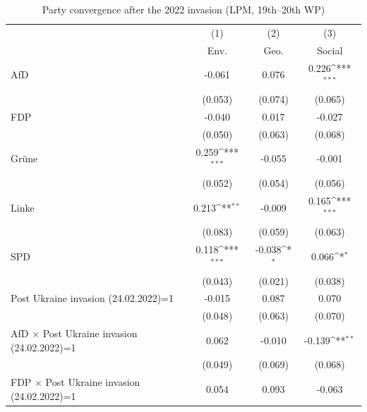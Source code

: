 \begin{table}[htbp]\centering
\def\sym#1{\ifmmode^{#1}\else\(^{#1}\)\fi}
\caption{Party convergence after the 2022 invasion (LPM, 19th--20th WP)}
\begin{tabular}{l*{3}{c}}
\toprule
                    &\multicolumn{1}{c}{(1)}&\multicolumn{1}{c}{(2)}&\multicolumn{1}{c}{(3)}\\
                    &\multicolumn{1}{c}{Env.}&\multicolumn{1}{c}{Geo.}&\multicolumn{1}{c}{Social}\\
\midrule
AfD                 &      -0.061         &       0.076         &       0.226\sym{***}\\
                    &     (0.053)         &     (0.074)         &     (0.065)         \\
\addlinespace
FDP                 &      -0.040         &       0.017         &      -0.027         \\
                    &     (0.050)         &     (0.063)         &     (0.068)         \\
\addlinespace
Grüne               &       0.259\sym{***}&      -0.055         &      -0.001         \\
                    &     (0.052)         &     (0.054)         &     (0.056)         \\
\addlinespace
Linke               &       0.213\sym{**} &      -0.009         &       0.165\sym{***}\\
                    &     (0.083)         &     (0.059)         &     (0.063)         \\
\addlinespace
SPD                 &       0.118\sym{***}&      -0.038\sym{*}  &       0.066\sym{*}  \\
                    &     (0.043)         &     (0.021)         &     (0.038)         \\
\addlinespace
Post Ukraine invasion (24.02.2022)=1&      -0.015         &       0.087         &       0.070         \\
                    &     (0.048)         &     (0.063)         &     (0.070)         \\
\addlinespace
AfD $\times$ Post Ukraine invasion (24.02.2022)=1&       0.062         &      -0.010         &      -0.139\sym{**} \\
                    &     (0.049)         &     (0.069)         &     (0.068)         \\
\addlinespace
FDP $\times$ Post Ukraine invasion (24.02.2022)=1&       0.054         &       0.093         &      -0.063         \\

\end{tabular}
\end{table}

